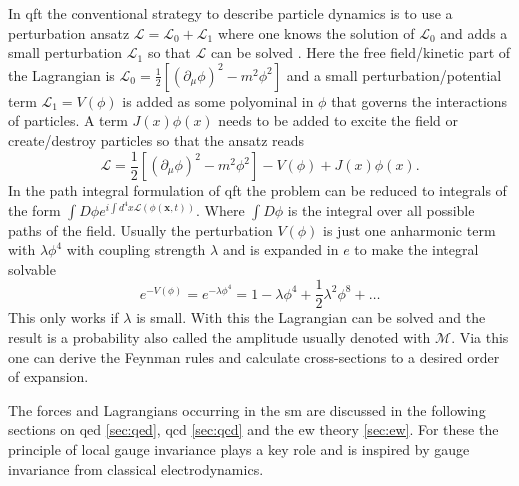 In \ac{qft} the conventional strategy to describe particle dynamics is to use a perturbation ansatz $\mathcal{L}=\mathcal{L}_0+\mathcal{L}_1$ where one knows the solution of $\mathcal{L}_0$ and adds a small perturbation $\mathcal{L}_1$ so that $\mathcal{L}$ can be solved \citep{zee2010quantum}. Here the free field/kinetic part of the Lagrangian is \mbox{$\mathcal{L}_0=\frac{1}{2}[(\partial_\mu \phi)^2 - m^2\phi^2] $} and a small perturbation/potential term $\mathcal{L}_1=V(\phi)$ is added as some polyominal in $\phi$ that governs the interactions of particles. A term $J(x)\phi(x)$ needs to be added to excite the field or create/destroy particles so that the ansatz reads
\begin{equation}
    \mathcal{L}=\frac{1}{2}[(\partial_\mu \phi)^2 - m^2\phi^2]
    -V(\phi) + J(x)\phi(x).
\end{equation}
In the path integral formulation of \ac{qft} the problem can be reduced to integrals of the form \mbox{$\int D\phi e^{i\int d^4x \mathcal{L}(\phi(\bm{x},t))}$}. Where $\int D\phi$ is the integral over all possible paths of the field. Usually the perturbation $V(\phi)$ is just one anharmonic term with $\lambda\phi^4$ with coupling strength $\lambda$ and is expanded in $e$ to make the integral solvable
\begin{equation}
    e^{-V(\phi)}=e^{-\lambda\phi^4}=1-\lambda\phi^4+\frac{1}{2}\lambda^2\phi^8+\dots
\end{equation}
This only works if $\lambda$ is small. With this the Lagrangian can be solved and the result is a probability also called the amplitude usually denoted with $\mathcal{M}$. Via this one can derive the Feynman rules and calculate cross-sections to a desired order of expansion.

The forces and Lagrangians occurring in the \ac{sm} are discussed in the following sections on \ac{qed} \ref{sec:qed}, \ac{qcd} \ref{sec:qcd} and the \ac{ew} theory \ref{sec:ew}. For these the principle of local gauge invariance plays a key role and is inspired by gauge invariance from classical electrodynamics.

